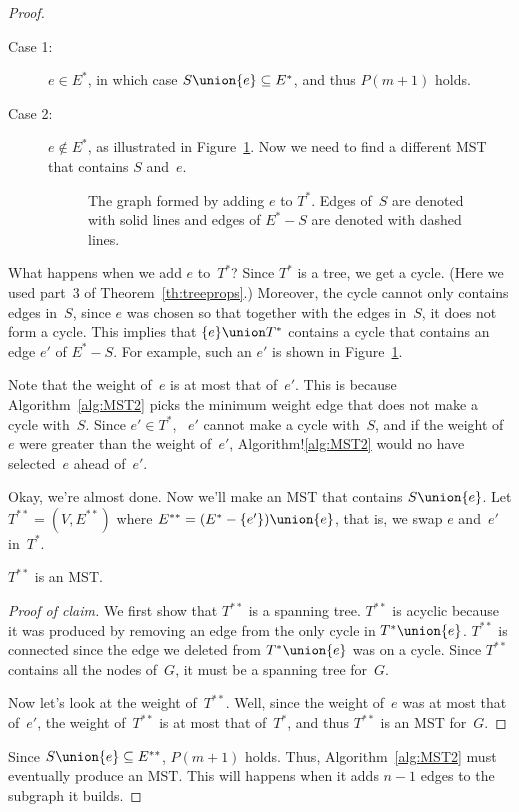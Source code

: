 \begin{proof}
\begin{description}
\item[Case 1:]
$e \in E^*$, in which case $S \union \{e\} \subseteq E^*$, and thus
  $P(m+1)$ holds.

\item[Case 2:]
$e \notin E^*$, as illustrated in Figure~\ref{fig:5KD}.  Now we need
  to find a different MST that contains $S$ and~$e$.

\begin{figure}


\caption{The graph formed by adding $e$ to $T^*$.  Edges of~$S$ are
  denoted with solid lines and edges of $E^* - S$ are denoted with
  dashed lines.}

\label{fig:5KD}
\end{figure}

\end{description}

What happens when we add $e$ to~$T^*$?  Since $T^*$ is a tree, we get
a cycle.  (Here we used part~3 of Theorem~\ref{th:treeprops}.)
Moreover, the cycle cannot only contains edges in~$S$, since $e$ was
chosen so that together with the edges in~$S$, it does not form a
cycle.  This implies that $\{e\} \union T^*$ contains a cycle that
contains an edge $e'$ of $E^* - S$.  For example, such an $e'$ is
shown in Figure~\ref{fig:5KD}.

Note that the weight of~$e$ is at most that of~$e'$.  This is because
Algorithm~\ref{alg:MST2} picks the minimum weight edge that does not
make a cycle with~$S$.  Since $e' \in T^*$, \ $e'$ cannot make a cycle
with~$S$, and if the weight of~$e$ were greater than the weight
of~$e'$, Algorithm!\ref{alg:MST2} would no have selected~$e$ ahead
of~$e'$.

Okay, we're almost done.  Now we'll make an MST that contains $S
\union \{e\}$.  Let $T^{**} = (V, E^{**})$ where $E^{**} = (E^* -
\{e'\}) \union \{e\}$, that is, we swap $e$ and~$e'$ in~$T^*$.

\begin{claim}\label{claim:MST2}
$T^{**}$ is an MST.
\end{claim}

\begin{proof}[Proof of claim]
We first show that $T^{**}$ is a spanning tree.  
$T^{**}$ is acyclic
because it was produced by removing an edge from the only cycle in
$T^{*} \union \{e\}$.
$T^{**}$ is connected
since the edge we deleted from $T^* \union \{e\}$ was on a cycle.
Since $T^{**}$ contains all the nodes of~$G$, it must be a spanning
tree for~$G$.

Now let's look at the weight of~$T^{**}$.  Well, since the weight
of~$e$ was at most that of~$e'$, the weight of~$T^{**}$ is at most
that of~$T^*$, and thus $T^{**}$ is an MST for~$G$.
\end{proof}

Since $S \union \{e\} \subseteq E^{**}$, $P(m + 1)$ holds.  Thus, 
Algorithm~\ref{alg:MST2} must eventually produce an MST\@.  This will
happens when it adds $n - 1$ edges to the subgraph it builds.
\end{proof}

